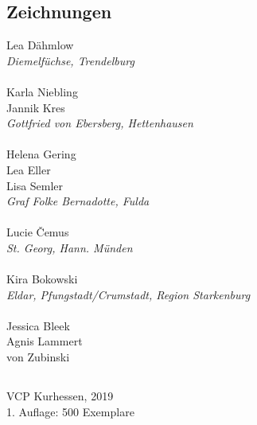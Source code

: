 \begin{centering}
\begin{multicols}{2}
\subsection*{Zeichnungen}
Lea Dähmlow \\ \textit{Diemelfüchse, Trendelburg} \\ ~\\
Karla Niebling \\ Jannik Kres \\ \textit{Gottfried von Ebersberg, Hettenhausen} \\ ~\\
Helena Gering \\ Lea Eller \\ Lisa Semler \\ \textit{Graf Folke Bernadotte, Fulda} \\ ~\\
Lucie \v{C}emus \\ \textit{St. Georg, Hann. Münden} \\ ~\\
Kira Bokowski \\ \textit{Eldar, Pfungstadt/Crumstadt, Region Starkenburg} \\ ~\\
Jessica Bleek \\ Agnis Lammert \\ von Zubinski

\end{multicols}

\vfill

\subsection*{}
VCP Kurhessen, 2019 \\
1. Auflage: 500 Exemplare

\end{centering}

